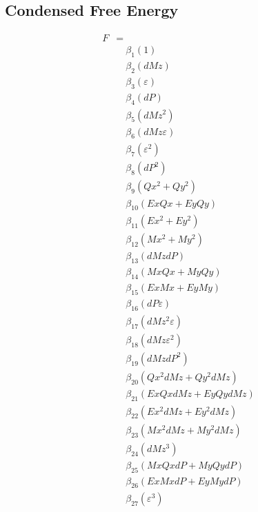 \documentclass{article}
\begin{document}
\subsection*{Condensed Free Energy}

\begin{align*}
F &= \\
&\quad \beta_{1} \left(1\right) \\
&\quad \beta_{2} \left(dMz\right) \\
&\quad \beta_{3} \left(ε\right) \\
&\quad \beta_{4} \left(dP\right) \\
&\quad \beta_{5} \left(dMz^{2}\right) \\
&\quad \beta_{6} \left(dMz ε\right) \\
&\quad \beta_{7} \left(ε^{2}\right) \\
&\quad \beta_{8} \left(dP^{2}\right) \\
&\quad \beta_{9} \left(Qx^{2} + Qy^{2}\right) \\
&\quad \beta_{10} \left(Ex Qx + Ey Qy\right) \\
&\quad \beta_{11} \left(Ex^{2} + Ey^{2}\right) \\
&\quad \beta_{12} \left(Mx^{2} + My^{2}\right) \\
&\quad \beta_{13} \left(dMz dP\right) \\
&\quad \beta_{14} \left(Mx Qx + My Qy\right) \\
&\quad \beta_{15} \left(Ex Mx + Ey My\right) \\
&\quad \beta_{16} \left(dP ε\right) \\
&\quad \beta_{17} \left(dMz^{2} ε\right) \\
&\quad \beta_{18} \left(dMz ε^{2}\right) \\
&\quad \beta_{19} \left(dMz dP^{2}\right) \\
&\quad \beta_{20} \left(Qx^{2} dMz + Qy^{2} dMz\right) \\
&\quad \beta_{21} \left(Ex Qx dMz + Ey Qy dMz\right) \\
&\quad \beta_{22} \left(Ex^{2} dMz + Ey^{2} dMz\right) \\
&\quad \beta_{23} \left(Mx^{2} dMz + My^{2} dMz\right) \\
&\quad \beta_{24} \left(dMz^{3}\right) \\
&\quad \beta_{25} \left(Mx Qx dP + My Qy dP\right) \\
&\quad \beta_{26} \left(Ex Mx dP + Ey My dP\right) \\
&\quad \beta_{27} \left(ε^{3}\right) \\

\end{align*}
\end{document}
